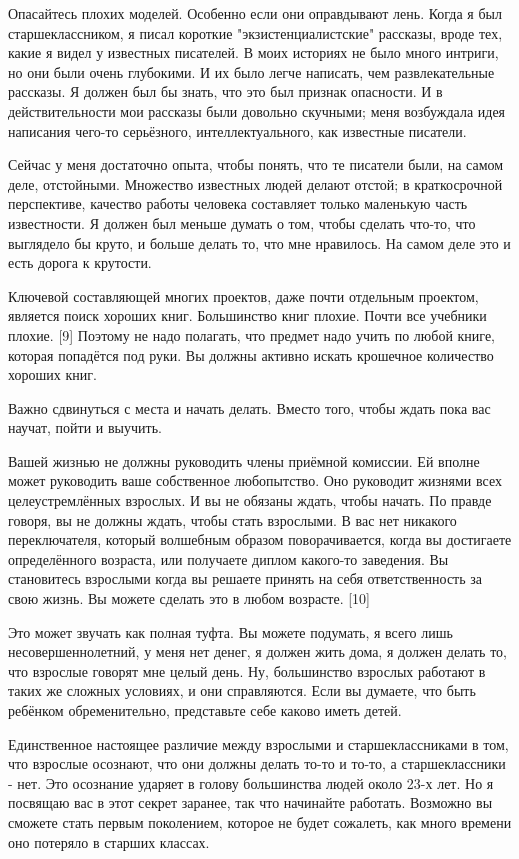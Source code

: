 \documentclass[ebook,12pt,oneside,openany]{memoir}
\begin{document}
Опасайтесь плохих моделей. Особенно если они оправдывают лень. Когда я
был старшеклассником, я писал короткие "экзистенциалистские" рассказы,
вроде тех, какие я видел у известных писателей. В моих историях не
было много интриги, но они были очень глубокими. И их было легче
написать, чем развлекательные рассказы. Я должен был бы знать, что это
был признак опасности. И в действительности мои рассказы были довольно
скучными; меня возбуждала идея написания чего-то серьёзного,
интеллектуального, как известные писатели.

Сейчас у меня достаточно опыта, чтобы понять, что те писатели были, на
самом деле, отстойными. Множество известных людей делают отстой; в
краткосрочной перспективе, качество работы человека составляет только
маленькую часть известности. Я должен был меньше думать о том, чтобы
сделать что-то, что выглядело бы круто, и больше делать то, что мне
нравилось. На самом деле это и есть дорога к крутости.

Ключевой составляющей многих проектов, даже почти отдельным проектом,
является поиск хороших книг. Большинство книг плохие. Почти все
учебники плохие. [9] Поэтому не надо полагать, что предмет надо учить
по любой книге, которая попадётся под руки. Вы должны активно искать
крошечное количество хороших книг.

Важно сдвинуться с места и начать делать. Вместо того, чтобы ждать
пока вас научат, пойти и выучить.

Вашей жизнью не должны руководить члены приёмной комиссии. Ей вполне
может руководить ваше собственное любопытство. Оно руководит жизнями
всех целеустремлённых взрослых. И вы не обязаны ждать, чтобы начать.
По правде говоря, вы не должны ждать, чтобы стать взрослыми. В вас нет
никакого переключателя, который волшебным образом поворачивается,
когда вы достигаете определённого возраста, или получаете диплом
какого-то заведения. Вы становитесь взрослыми когда вы решаете принять
на себя ответственность за свою жизнь. Вы можете сделать это в любом
возрасте. [10]

Это может звучать как полная туфта. Вы можете подумать, я всего лишь
несовершеннолетний, у меня нет денег, я должен жить дома, я должен
делать то, что взрослые говорят мне целый день. Ну, большинство
взрослых работают в таких же сложных условиях, и они справляются. Если
вы думаете, что быть ребёнком обременительно, представьте себе каково
иметь детей.

Единственное настоящее различие между взрослыми и старшеклассниками в
том, что взрослые осознают, что они должны делать то-то и то-то, а
старшеклассники - нет. Это осознание ударяет в голову большинства
людей около 23-х лет. Но я посвящаю вас в этот секрет заранее, так что
начинайте работать. Возможно вы сможете стать первым поколением,
которое не будет сожалеть, как много времени оно потеряло в старших
классах.
\end{document}
